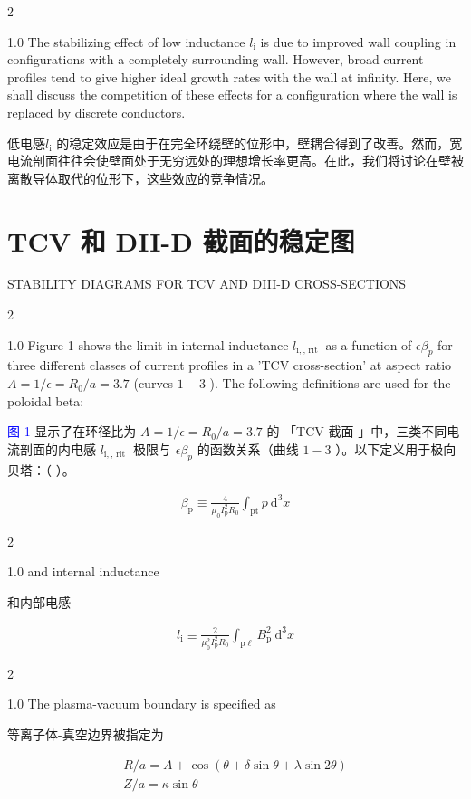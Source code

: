 \documentclass[utf8]{ctexart}
\newcommand\enzhbox[2]{
  	\quad\par \begin{paracol}{2} \colseprulecolor{black} 
  		\begin{spacing}{1.0}
  			\footnotesize  #1
  		\end{spacing}
  		\switchcolumn[1] 
  		#2
  	\end{paracol} \quad\par
  }
\begin{document}
\begin{sloppypar}
 
\enzhbox{  The stabilizing effect of low inductance $l_{\mathrm{i}}$ is due to improved wall coupling in configurations with a completely surrounding wall. However, broad current profiles tend to give higher ideal growth rates with the wall at infinity. Here, we shall discuss the competition of these effects for a configuration where the wall is replaced by discrete conductors.}{
低电感$l_{\mathrm{i}}$ 的稳定效应是由于在完全环绕壁的位形中，壁耦合得到了改善。然而，宽电流剖面往往会使壁面处于无穷远处的理想增长率更高。在此，我们将讨论在壁被离散导体取代的位形下，这些效应的竞争情况。}
  
 \section{TCV 和 DII-D 截面的稳定图}
 {  \small STABILITY DIAGRAMS FOR TCV AND DIII-D CROSS-SECTIONS \par }
 
\enzhbox{  Figure 1 shows the limit in internal inductance $l_{\mathrm{i}, \text {, rit }}$ as a function of $\epsilon \beta_{p}$ for three different classes of current profiles in a 'TCV cross-section' at aspect ratio $A=1 / \epsilon=R_{0} / a=3.7$ (curves $1-3$ ). The following definitions are used for the poloidal beta:\\}{
\textcolor{blue}{图 1} 显示了在环径比为 $A=1 / \epsilon=R_{0} / a=3.7$  的 「TCV 截面 」中，三类不同电流剖面的内电感 $l_{\mathrm{i}, \text {, rit }}$  极限与 $\epsilon \beta_{p}$  的函数关系（曲线 $1-3$  ）。以下定义用于极向贝塔：（ ）。}
 \begin{align*}
 	 \beta_{\mathrm{p}} \equiv \frac{4}{\mu_{0} I_{\mathrm{p}}^{2} R_{0}} \int_{\mathrm{pt}} p \mathrm{~d}^{3} x
 \end{align*}
  
 
\enzhbox{  \noindent and internal inductance\\}{
\noindent 和内部电感}
  \begin{align*}
  l_{\mathrm{i}} \equiv \frac{2}{\mu_{0}^{2} I_{\mathrm{p}}^{2} R_{0}} \int_{\mathrm{p} \ell} B_{\mathrm{p}}^{2} \mathrm{~d}^{3} x
  \end{align*}
  
 
\enzhbox{  The plasma-vacuum boundary is specified as\\}{
等离子体-真空边界被指定为}
  \begin{gather*}
  	R / a=A+\cos (\theta+\delta \sin \theta+\lambda \sin 2 \theta) \tag{1}\\
  Z / a=\kappa \sin \theta 
  \end{gather*}
  

\end{sloppypar}
\end{document}
